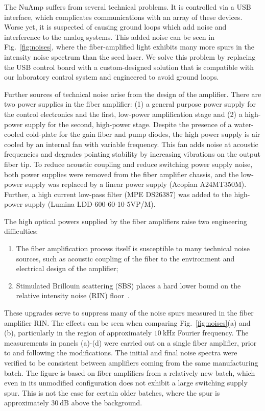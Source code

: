 \documentclass[twocolumn,aps,pra,showpacs,preprintnumbers,bibnotes]{revtex4-1}
\newcommand\unit[2]{\ensuremath{#1~\mathrm{{#2}}}}
\begin{document}
The NuAmp suffers from several technical problems.
It is controlled via a USB interface, which complicates communications with an array of these devices.
Worse yet, it is suspected of causing ground loops which add noise and interference to the analog systems.
This added noise can be seen in Fig.~\ref{fig:noises}, where the fiber-amplified light exhibits many more spurs in the intensity noise spectrum than the seed laser.
We solve this problem by replacing the USB control board with a custom-designed solution  that is compatible with our laboratory control system and engineered to avoid ground loops.


Further sources of technical noise arise from the design of the amplifier. There are two power supplies in the fiber amplifier: (1) a general purpose power supply for the control electronics and the first, low-power amplification stage and (2) a high-power supply for the second, high-power stage.
Despite the presence of a water-cooled cold-plate for the gain fiber and pump diodes, the high power supply is air cooled by an internal fan with variable frequency.
This fan adds noise at acoustic frequencies and degrades pointing stability by increasing vibrations on the output fiber tip.
To reduce acoustic coupling and reduce switching power supply noise, both power supplies were removed from the fiber amplifier chassis, and the low-power supply was replaced by a linear power supply (Acopian A24MT350M).
Further, a high current low-pass filter (MPE DS26387) was added to the high-power supply (Lumina LDD-600-60-10-5VP/M).

The high optical powers supplied by the fiber amplifiers raise two engineering difficulties:
\begin{enumerate}
  \item The fiber amplification process itself is susceptible to many technical noise sources, such as acoustic coupling of the fiber to the environment and electrical design of the amplifier;
  \item Stimulated Brillouin scattering (SBS) places a hard lower bound on the relative intensity noise (RIN) floor~\cite{Agrawal2013}.
\end{enumerate}

These upgrades serve to suppress many of the noise spurs measured in the fiber amplifier RIN.
The effects can be seen when comparing Fig.~\ref{fig:noises}(a) and (b), particularly in the region of approximately \unit{10}{kHz} Fourier frequency.
The measurements in panels (a)-(d) were carried out on a single fiber amplifier, prior to and following the modifications. The initial and final noise spectra were verified to be consistent between amplifiers coming from the same manufacturing batch.
The figure is based on fiber amplifiers from a relatively new batch, which even in its unmodified configuration does not exhibit a large switching supply spur.
This is not the case for certain older batches, where the spur is approximately \unit{30}{dB} above the background.
\end{document}
